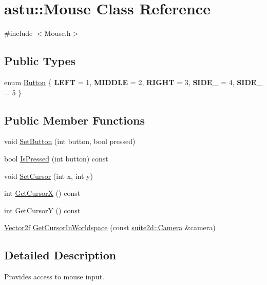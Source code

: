 \hypertarget{classastu_1_1Mouse}{}\section{astu\+:\+:Mouse Class Reference}
\label{classastu_1_1Mouse}


{\ttfamily \#include $<$Mouse.\+h$>$}

\subsection*{Public Types}
\begin{DoxyCompactItemize}
\item 
enum \hyperlink{classastu_1_1Mouse_a18205a089111599d94479bfecc5ca7ec}{Button} \{ \newline
{\bfseries L\+E\+FT} = 1, 
{\bfseries M\+I\+D\+D\+LE} = 2, 
{\bfseries R\+I\+G\+HT} = 3, 
{\bfseries S\+I\+D\+E\+\_} = 4, 
\newline
{\bfseries S\+I\+D\+E\+\_} = 5
 \}
\end{DoxyCompactItemize}
\subsection*{Public Member Functions}
\begin{DoxyCompactItemize}
\item 
void \hyperlink{classastu_1_1Mouse_a1f60d23fe113d85a80569a5a3539eabf}{Set\+Button} (int button, bool pressed)
\item 
bool \hyperlink{classastu_1_1Mouse_a400f6483be85ac0e4694806bdd22e25a}{Is\+Pressed} (int button) const
\item 
void \hyperlink{classastu_1_1Mouse_a1aebb61a647f115381eeb2d3528fefe8}{Set\+Cursor} (int x, int y)
\item 
int \hyperlink{classastu_1_1Mouse_a22202c4dec1e13df857a524df45b4fc0}{Get\+CursorX} () const
\item 
int \hyperlink{classastu_1_1Mouse_a8f008ad4c4a9cba165ff74e44b0bdb17}{Get\+CursorY} () const
\item 
\hyperlink{classastu_1_1Vector2}{Vector2f} \hyperlink{classastu_1_1Mouse_a7b27c582a681a9328c9d36367a62183f}{Get\+Cursor\+In\+Worldspace} (const \hyperlink{classastu_1_1suite2d_1_1Camera}{suite2d\+::\+Camera} \&camera)
\end{DoxyCompactItemize}


\subsection{Detailed Description}
Provides access to mouse input.

